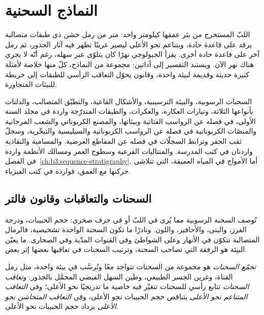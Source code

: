 \chapter{النماذج السحنية}\label{ch:b3:facies-models}

اللبّ المستخرج من بئر عمقها كيلومتر واحد: متر من رمل خشن ذي طبقات متصالبة
يرقد على قاعدة حادة، ويتناعم نحو الأعلى ليصير غرينًا تظهر فيه آثار الجذور،
ثم رمل آخر على قاعدة حادة أخرى. يقرأ الجيولوجي نهرًا
كان يتلوّى عبر سهله، رغم أنّه لا يجري هناك نهر الآن. ويستند التفسير إلى أداتين:
مجموعة من النماذج، كلّ منها خلاصة لأمثلة كثيرة حديثة وقديمة لبيئة واحدة،
وقانون يحوّل التعاقب الرأسي للطبقات
إلى خريطة للبيئات المتجاورة.

\begin{recall}
السحنات الرسوبية، والبيئة الترسيبية، والأشكال القاعية، والتطبّق المتصالب،
والدلتات بأنواعها الثلاثة، وتيارات العكارة، والعكرات، والطبقات المتدرّجة
واردة في مجلد السنة الأولى، في فصله عن الرواسب الفتاتية وبيئاتها،
والمصنع الكربوناتي والشعب المرجانية والمنصّات الكربوناتية في فصله
عن الرواسب الكربوناتية والسيليسية والتبخّرية، وسجلّ ثقب الحفر
وترابط السجلّات في فصله عن المقاطع العرضية. والمسامية والنفاذية
واردتان في كتب المدرسة. والمتتاليات الفرعية وسطوح الغمر ومسالك الأنظمة
واردة في الفصل~\ref{ch:b3:sequence-stratigraphy}. أما الأمواج في المياه العميقة،
التي تتلاشى حركتها مع العمق، فواردة في كتب الفيزياء.
\end{recall}

\section{السحنات والتعاقبات وقانون فالتر}\label{sec:b3:facies-models:walther}

تُوصف السحنة الرسوبية مما يُرى في اللبّ أو في
جرف صخري: حجم الحبيبات، ودرجة الفرز، والبنى، والأحافير، واللون. ونادرًا ما تكون السحنة الواحدة
تشخيصية، فالرمال المتصالبة تتكوّن في الأنهار وعلى الشواطئ وفي القنوات المدّية
وفي الصحارى. ما يعيّن البيئة هو الرفقة التي تصاحب السحنة،
وترتيب السحنات في تعاقبها بعضها إثر بعض.

\begin{definition}\label{def:b3:facies-models:association}
\emph{تجمّع السحنات} هو مجموعة من السحنات
تتواجد معًا وتُرسَّب في بيئة واحدة، مثل رمل القناة،
وغرين الجسر الطبيعي، وطين السهل الفيضي المحمَّل بالجذور.
و\emph{تعاقب السحنات} تتابع رأسي للسحنات تتغيّر فيه خاصية ما تدريجيًا نحو الأعلى؛ وفي
\emph{التعاقب المتناعم نحو الأعلى} يتناقص حجم الحبيبات نحو الأعلى،
وفي \emph{التعاقب المتخاشن نحو الأعلى}
يزداد
حجم الحبيبات نحو الأعلى.
\end{definition}

